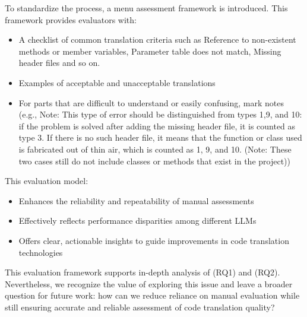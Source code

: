 To standardize the process, a menu assessment framework is introduced. This framework provides evaluators with:

\begin{itemize}
    \item A checklist of common translation criteria such as Reference to non-existent methods or member variables, Parameter table does not match, Missing header files and so on.
    \item Examples of acceptable and unacceptable translations
    \item For parts that are difficult to understand or easily confusing, mark notes (e.g., Note: This type of error should be distinguished from types 1,9, and 10: if the problem is solved after adding the missing header file, it is counted as type 3. If there is no such header file, it means that the function or class used is fabricated out of thin air, which is counted as 1, 9, and 10. (Note: These two cases still do not include classes or methods that exist in the project))
\end{itemize}

This evaluation model:

\begin{itemize}
    \item Enhances the reliability and repeatability of manual assessments
    \item Effectively reflects performance disparities among different LLMs
    \item Offers clear, actionable insights to guide improvements in code translation technologies
\end{itemize}

This evaluation framework supports in-depth analysis of (RQ1) and (RQ2). Nevertheless, we recognize the value of exploring this issue and leave a broader question for future work: how can we reduce reliance on manual evaluation while still ensuring accurate and reliable assessment of code translation quality?



